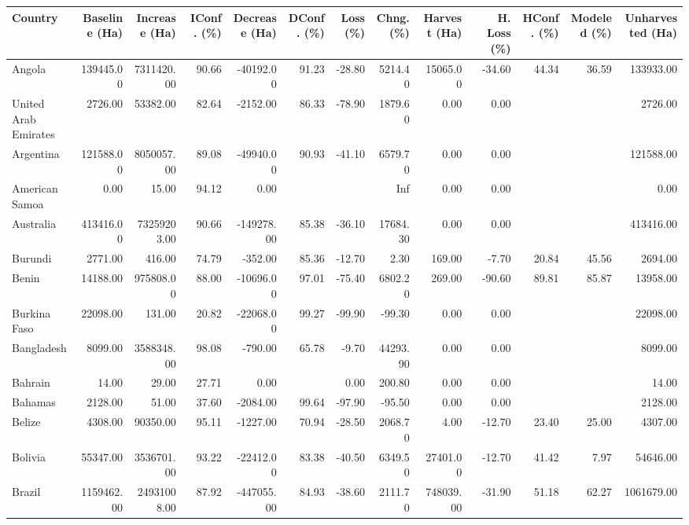 \begin{table}[ht]
\centering
\begin{tabular}{lrrrrrrrrrrrr}
  \hline
Country & Baseline (Ha) & Increase (Ha) & IConf. (\%) & Decrease (Ha) & DConf. (\%) & Loss (\%) & Chng. (\%) & Harvest (Ha) & H. Loss (\%) & HConf. (\%) & Modeled (\%) & Unharvested (Ha) \\ 
  \hline
Angola & 139445.00 & 7311420.00 & 90.66 & -40192.00 & 91.23 & -28.80 & 5214.40 & 15065.00 & -34.60 & 44.34 & 36.59 & 133933.00 \\ 
  United Arab Emirates & 2726.00 & 53382.00 & 82.64 & -2152.00 & 86.33 & -78.90 & 1879.60 & 0.00 & 0.00 &  &  & 2726.00 \\ 
  Argentina & 121588.00 & 8050057.00 & 89.08 & -49940.00 & 90.93 & -41.10 & 6579.70 & 0.00 & 0.00 &  &  & 121588.00 \\ 
  American Samoa & 0.00 & 15.00 & 94.12 & 0.00 &  &  & Inf & 0.00 & 0.00 &  &  & 0.00 \\ 
  Australia & 413416.00 & 73259203.00 & 90.66 & -149278.00 & 85.38 & -36.10 & 17684.30 & 0.00 & 0.00 &  &  & 413416.00 \\ 
  Burundi & 2771.00 & 416.00 & 74.79 & -352.00 & 85.36 & -12.70 & 2.30 & 169.00 & -7.70 & 20.84 & 45.56 & 2694.00 \\ 
  Benin & 14188.00 & 975808.00 & 88.00 & -10696.00 & 97.01 & -75.40 & 6802.20 & 269.00 & -90.60 & 89.81 & 85.87 & 13958.00 \\ 
  Burkina Faso & 22098.00 & 131.00 & 20.82 & -22068.00 & 99.27 & -99.90 & -99.30 & 0.00 & 0.00 &  &  & 22098.00 \\ 
  Bangladesh & 8099.00 & 3588348.00 & 98.08 & -790.00 & 65.78 & -9.70 & 44293.90 & 0.00 & 0.00 &  &  & 8099.00 \\ 
  Bahrain & 14.00 & 29.00 & 27.71 & 0.00 &  & 0.00 & 200.80 & 0.00 & 0.00 &  &  & 14.00 \\ 
  Bahamas & 2128.00 & 51.00 & 37.60 & -2084.00 & 99.64 & -97.90 & -95.50 & 0.00 & 0.00 &  &  & 2128.00 \\ 
  Belize & 4308.00 & 90350.00 & 95.11 & -1227.00 & 70.94 & -28.50 & 2068.70 & 4.00 & -12.70 & 23.40 & 25.00 & 4307.00 \\ 
  Bolivia & 55347.00 & 3536701.00 & 93.22 & -22412.00 & 83.38 & -40.50 & 6349.50 & 27401.00 & -12.70 & 41.42 & 7.97 & 54646.00 \\ 
  Brazil & 1159462.00 & 24931008.00 & 87.92 & -447055.00 & 84.93 & -38.60 & 2111.70 & 748039.00 & -31.90 & 51.18 & 62.27 & 1061679.00 \\ 

\end{tabular}
\end{table}
